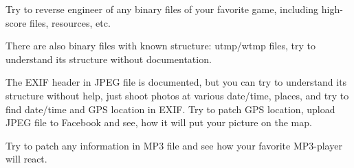 
Try to reverse engineer of any binary files of your favorite game, including high-score files, resources, etc.

There are also binary files with known structure: utmp/wtmp files, try to understand its structure without documentation.

The EXIF header in JPEG file is documented, but you can try to understand its structure without help, just shoot photos
at various date/time, places, and try to find date/time and GPS location in EXIF.
Try to patch GPS location, upload JPEG file to Facebook and see, how it will put your picture on the map.

Try to patch any information in MP3 file and see how your favorite MP3-player will react.

